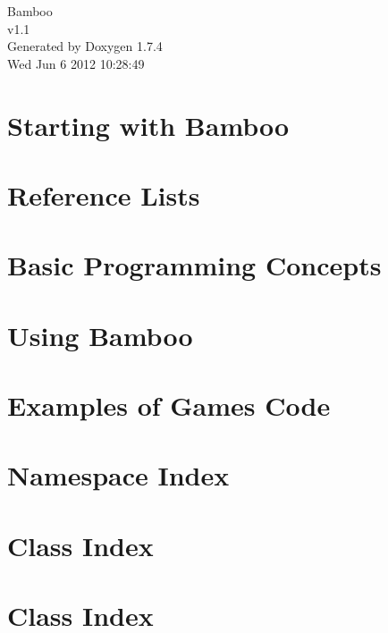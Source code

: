 \documentclass[a4paper]{book}
\begin{document}
\hypersetup{pageanchor=false}
\begin{titlepage}
\vspace*{7cm}
\begin{center}
{\Large Bamboo \\[1ex]\large v1.1 }\\
\vspace*{1cm}
{\large Generated by Doxygen 1.7.4}\\
\vspace*{0.5cm}
{\small Wed Jun 6 2012 10:28:49}\\
\end{center}
\end{titlepage}
\clearemptydoublepage
{}
\tableofcontents
\clearemptydoublepage
{}
\hypersetup{pageanchor=true}
\chapter{Starting with Bamboo}
\label{index}\hypertarget{index}{}
\chapter{Reference Lists}
\label{ReferenceLists}
\hypertarget{ReferenceLists}{}

\chapter{Basic Programming Concepts}
\label{ProgrammingBasics}
\hypertarget{ProgrammingBasics}{}

\chapter{Using Bamboo}
\label{UsingEnginePage}
\hypertarget{UsingEnginePage}{}

\chapter{Examples of Games Code}
\label{CodeProgramExamples}
\hypertarget{CodeProgramExamples}{}

\chapter{Namespace Index}

\chapter{Class Index}

\chapter{Class Index}

\end{document}
